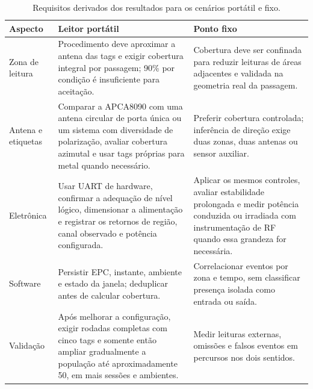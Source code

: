 \begin{table}[H]
    \centering
    \caption{Requisitos derivados dos resultados para os cenários portátil e fixo.}
    \label{tab:requisitos-evolucao}
    \footnotesize
    \begin{tabularx}{\textwidth}{p{3.0cm}X X}
        \toprule
        \textbf{Aspecto} & \textbf{Leitor portátil} & \textbf{Ponto fixo} \\
        \midrule
        Zona de leitura & Procedimento deve aproximar a antena das tags e exigir cobertura integral por passagem; 90\% por condição é insuficiente para aceitação. & Cobertura deve ser confinada para reduzir leituras de áreas adjacentes e validada na geometria real da passagem. \\
        Antena e etiquetas & Comparar a APCA8090 com uma antena circular de porta única ou um sistema com diversidade de polarização, avaliar cobertura azimutal e usar tags próprias para metal quando necessário. & Preferir cobertura controlada; inferência de direção exige duas zonas, duas antenas ou sensor auxiliar. \\
        Eletrônica & Usar UART de hardware, confirmar a adequação de nível lógico, dimensionar a alimentação e registrar os retornos de região, canal observado e potência configurada. & Aplicar os mesmos controles, avaliar estabilidade prolongada e medir potência conduzida ou irradiada com instrumentação de RF quando essa grandeza for necessária. \\
        Software & Persistir EPC, instante, ambiente e estado da janela; deduplicar antes de calcular cobertura. & Correlacionar eventos por zona e tempo, sem classificar presença isolada como entrada ou saída. \\
        Validação & Após melhorar a configuração, exigir rodadas completas com cinco tags e somente então ampliar gradualmente a população até aproximadamente 50, em mais sessões e ambientes. & Medir leituras externas, omissões e falsos eventos em percursos nos dois sentidos. \\
        \bottomrule
    \end{tabularx}
\end{table}
